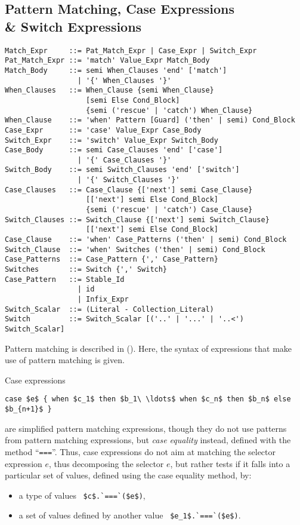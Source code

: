 \subsection[Pattern Matching, Case Expressions \& Switch Expressions]{Pattern Matching, Case Expressions \\\& Switch Expressions}
\label{sec:case-exprs}


\syntax\begin{lstlisting}
Match_Expr     ::= Pat_Match_Expr | Case_Expr | Switch_Expr
Pat_Match_Expr ::= 'match' Value_Expr Match_Body
Match_Body     ::= semi When_Clauses 'end' ['match']
                 | '{' When_Clauses '}'
When_Clauses   ::= When_Clause {semi When_Clause} 
                   [semi Else Cond_Block]
                   {semi ('rescue' | 'catch') When_Clause}
When_Clause    ::= 'when' Pattern [Guard] ('then' | semi) Cond_Block
Case_Expr      ::= 'case' Value_Expr Case_Body
Switch_Expr    ::= 'switch' Value_Expr Switch_Body
Case_Body      ::= semi Case_Clauses 'end' ['case']
                 | '{' Case_Clauses '}'
Switch_Body    ::= semi Switch_Clauses 'end' ['switch']
                 | '{' Switch_Clauses '}'
Case_Clauses   ::= Case_Clause {['next'] semi Case_Clause}
                   [['next'] semi Else Cond_Block]
                   {semi ('rescue' | 'catch') Case_Clause}
Switch_Clauses ::= Switch_Clause {['next'] semi Switch_Clause}
                   [['next'] semi Else Cond_Block]
Case_Clause    ::= 'when' Case_Patterns ('then' | semi) Cond_Block
Switch_Clause  ::= 'when' Switches ('then' | semi) Cond_Block
Case_Patterns  ::= Case_Pattern {',' Case_Pattern}
Switches       ::= Switch {',' Switch}
Case_Pattern   ::= Stable_Id
                 | id
                 | Infix_Expr
Switch_Scalar  ::= (Literal - Collection_Literal)
Switch         ::= Switch_Scalar [('..' | '...' | '..<') Switch_Scalar]
\end{lstlisting}

Pattern matching is described in (). Here, the syntax of expressions that make use of pattern matching is given. 

Case expressions 
\begin{lstlisting}
case $e$ { when $c_1$ then $b_1\ \ldots$ when $c_n$ then $b_n$ else $b_{n+1}$ }
\end{lstlisting}
are simplified pattern matching expressions, though they do not use patterns from pattern matching expressions, but {\em case equality} instead, defined with the method ``\lstinline!===!''. Thus, case expressions do not aim at matching the selector expression $e$, thus decomposing the selector $e$, but rather tests if it falls into a particular set of values, defined using the case equality method, by:
\begin{itemize}
  \item a type of values ~\lstinline!$c$.`===`($e$)!,
  \item a set of values defined by another value ~\lstinline!$e_1$.`===`($e$)!.
\end{itemize}

